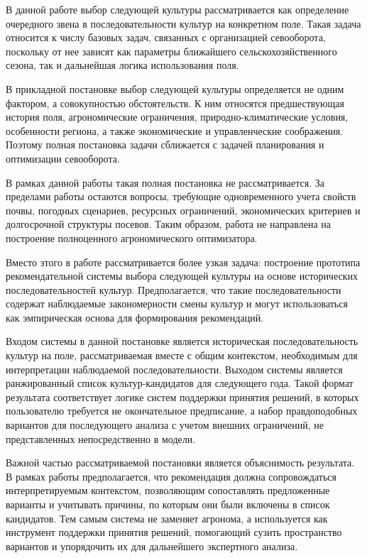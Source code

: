 \par
{}

В данной работе выбор следующей культуры рассматривается как определение очередного звена в последовательности культур
на конкретном поле. Такая задача относится к числу базовых задач, связанных с организацией севооборота, поскольку от
нее зависят как параметры ближайшего сельскохозяйственного сезона, так и дальнейшая логика использования поля.

В прикладной постановке выбор следующей культуры определяется не одним фактором, а совокупностью обстоятельств. К ним
относятся предшествующая история поля, агрономические ограничения, природно-климатические условия, особенности
региона, а также экономические и управленческие соображения. Поэтому полная постановка задачи сближается с задачей
планирования и оптимизации севооборота.

В рамках данной работы такая полная постановка не рассматривается. За пределами работы остаются вопросы, требующие
одновременного учета свойств почвы, погодных сценариев, ресурсных ограничений, экономических критериев и долгосрочной
структуры посевов. Таким образом, работа не направлена на построение полноценного агрономического оптимизатора.

Вместо этого в работе рассматривается более узкая задача: построение прототипа рекомендательной системы выбора
следующей культуры на основе исторических последовательностей культур. Предполагается, что такие последовательности
содержат наблюдаемые закономерности смены культур и могут использоваться как эмпирическая основа для формирования
рекомендаций.

Входом системы в данной постановке является историческая последовательность культур на поле, рассматриваемая вместе с
общим контекстом, необходимым для интерпретации наблюдаемой последовательности. Выходом системы является ранжированный
список культур-кандидатов для следующего года. Такой формат результата соответствует логике систем поддержки принятия
решений, в которых пользователю требуется не окончательное предписание, а набор правдоподобных вариантов для
последующего анализа с учетом внешних ограничений, не представленных непосредственно в модели.

Важной частью рассматриваемой постановки является объяснимость результата. В рамках работы предполагается, что
рекомендация должна сопровождаться интерпретируемым контекстом, позволяющим сопоставлять предложенные варианты и учитывать причины,
по которым они были включены в список кандидатов. Тем самым система не заменяет агронома, а используется как инструмент поддержки принятия решений,
помогающий сузить пространство вариантов и упорядочить их для дальнейшего экспертного анализа.

